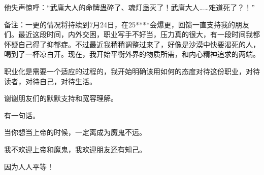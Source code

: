 \begin{this_body}
他失声惊呼：“武庸大人的命牌蛊碎了、魂灯蛊灭了！武庸大人……难道死了？！”

备注：一更的情况将持续到7月24日，在25****会爆更，回馈一直支持我的朋友们。最近这段时间，内外交困，职业写手不好当，压力真的很大，有一段时间我都怀疑自己得了抑郁症。不过最近我稍稍调整过来了，好像是沙漠中快要渴死的人，喝到了一杯凉白开。现在，我开始平衡外界的物质所需，和内心精神追求的两端。

职业化是需要一个适应的过程的，我开始明确该用如何的态度对待这份职业，对待读者，对待自己，对待生活。

谢谢朋友们的默默支持和宽容理解。

有一句话。

当你想当上帝的时候，一定离成为魔鬼不远。

我不欢迎上帝和魔鬼，我欢迎朋友还有知己。

因为人人平等！

\end{this_body}


